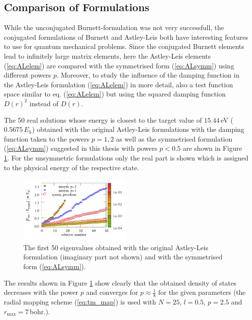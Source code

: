\subsection{Comparison of Formulations}
\label{ch:bmFormul}
While the unconjugated Burnett-formulation was not very successfull, the conjugated formulations of Burnett and Astley-Leis both have interesting features to use for quantum mechanical problems.
Since the conjugated Burnett elements lead to infinitely large matrix elements, here the Astley-Leis elements (\ref{eq:ALelem}) are compared with the symmetrised form (\ref{eq:ALsymm}) using different powers $p$.
Moreover, to study the influence of the damping function in the Astley-Leis formulation (\ref{eq:ALelem}) in more detail, also a test function space similar to eq. (\ref{eq:ALelem}) but using the squared damping function $D(r)^2$ instead of $D(r)$.

The 50 real solutions whose energy is closest to the target value of $15.44\,$eV ($0.5675\,E_h$) obtained with the original Astley-Leis formulations with the damping function taken to the powers $p=1,2$ as well as the symmetrised formulation (\ref{eq:ALsymm}) suggested in this thesis with powers $p<0.5$ are shown in Figure \ref{fig:IFEMform_spect}.
For the unsymmetric formulations only the real part is shown which is assigned to the physical energy of the respective state.
\begin{figure}
\includegraphics[width=0.5\textwidth]{Figures/IFem_form_spectra}
\caption{The first 50 eigenvalues obtained with the original Astley-Leis formulation (imaginary part not shown) and with the symmetrised form (\ref{eq:ALsymm}).}
\label{fig:IFEMform_spect}
\end{figure}
The results shown in Figure \ref{fig:IFEMform_spect} show clearly that the obtained density of states decreases with the power $p$ and converges for $p\approx \frac 18$ for the given parameters (the radial mapping scheme (\ref{eq:tm_map}) is used with $N=25$, $l=0.5$, $p=2.5$ and $r_\text{max}=7\,$bohr.).

